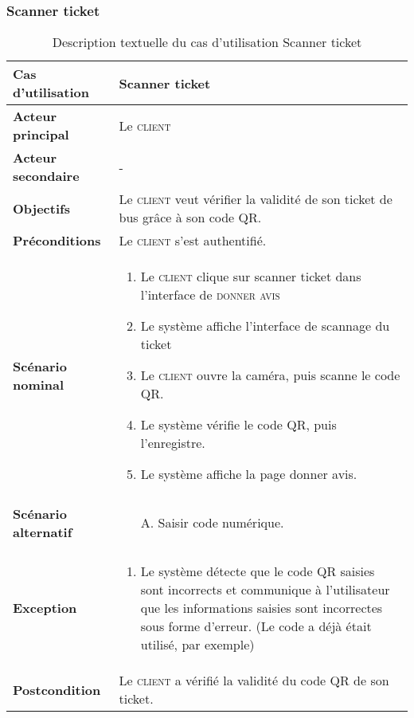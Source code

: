         \subsubsection[Scanner ticket]{Scanner ticket}
        \begin{longtable}{p{4cm} p{9cm}}
            \caption{Description textuelle du cas d’utilisation Scanner ticket}
            \label{table:usecaseScannerJ}
            \\\hline\hline
                \textbf{Cas d’utilisation} & \textbf{Scanner ticket}
            \\\hline\hline
                    \textbf{Acteur principal} & Le \textsc{client}
                \\
                    \textbf{Acteur secondaire} & -
                \\
                    \textbf{Objectifs} & Le \textsc{client} veut vérifier la
                    validité de son ticket de bus grâce à son code QR.
                \\
                    \textbf{Préconditions} & Le \textsc{client} s’est authentifié.
                \\
                \textbf{Scénario nominal} &
                    \begin{enumerate}[leftmargin=*]
                        \item Le \textsc{client} clique sur scanner ticket dans
                        l’interface de \textsc{donner avis}
                        \item Le système affiche l’interface de scannage du ticket
                        \item Le \textsc{client} ouvre la caméra, puis scanne le code QR.
                        \item Le système vérifie le code QR, puis l’enregistre.
                        \item Le système affiche la page donner avis.
                    \end{enumerate}
                \\
                \textbf{Scénario alternatif} &
                    \begin{enumerate}[leftmargin=*]
                        \item [A.] Saisir code numérique.
                    \end{enumerate}
                \\
                \textbf{Exception} &
                \begin{enumerate}[leftmargin=*]
                        \item Le système détecte que le code QR saisies sont incorrects et communique à
                        l’utilisateur que les informations saisies sont incorrectes sous forme d’erreur.
                        (Le code a déjà était utilisé, par exemple)
                    \end{enumerate}
                \\
                \textbf{Postcondition} & Le \textsc{client} a vérifié la validité du code QR de son ticket.
            \\\bottomrule
        \end{longtable}

